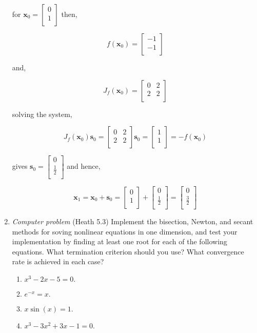 \documentclass{article}
\renewcommand{\vec}[1]{\mathbf{#1}}
\begin{document}
\begin{enumerate}
for $\vec{x}_0=\left[\begin{array}{c} 0 \\ 1 \\ \end{array}\right]$ then,

$$f(\vec{x}_0)=\left[\begin{array}{c} -1 \\ -1 \\ \end{array}\right]$$

and,

$$J_f(\vec{x}_0)=\left[\begin{array}{cc} 0 & 2 \\ 2 & 2 \\ \end{array}\right]$$

solving the system,

$$J_f(\vec{x}_0)\vec{s}_0=\left[\begin{array}{cc} 0 & 2 \\ 2 & 2 \\ \end{array}\right]\vec{s}_0=\left[\begin{array}{c} 1 \\ 1 \\ \end{array}\right]=-f(\vec{x}_0)$$

gives $\vec{s}_0=\left[\begin{array}{c} 0 \\ \frac{1}{2} \\ \end{array}\right]$ and hence,

$$\vec{x}_1=\vec{x}_0+\vec{s}_0=\left[\begin{array}{c} 0 \\ 1 \\ \end{array}\right]+\left[\begin{array}{c} 0 \\ \frac{1}{2} \\ \end{array}\right]=\left[\begin{array}{c} 0 \\ \frac{3}{2} \\ \end{array}\right]$$

\item \emph{Computer problem} (Heath 5.3) Implement the bisection, Newton, and secant methods for soving nonlinear equations in one dimension, and test your implementation by finding at least one
  root for each of the following equations.  What termination criterion should you use?  What convergence rate is achieved in each case?
\begin{enumerate}
\item $x^3 - 2 x - 5 = 0.$
\item $e^{-x} = x.$
\item $x \sin(x) = 1.$
\item $x^3 - 3 x^2 + 3 x - 1 = 0.$
\end{enumerate}

\end{enumerate}
\end{document}
